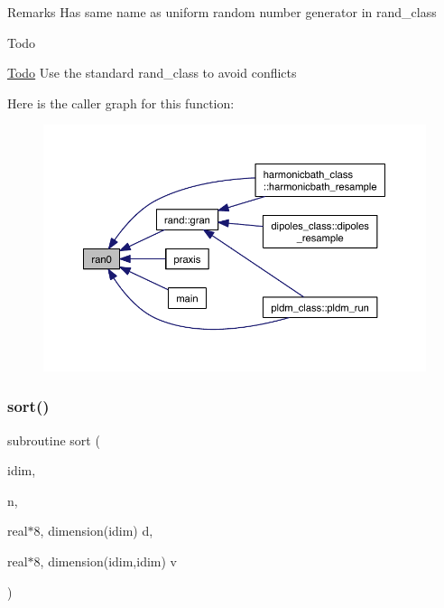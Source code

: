 \begin{DoxyRemark}{Remarks}
Has same name as uniform random number generator in rand\+\_\+class 
\end{DoxyRemark}
\begin{DoxyRefDesc}{Todo}
\item[\hyperlink{todo__todo000004}{Todo}]Use the standard rand\+\_\+class to avoid conflicts \end{DoxyRefDesc}
Here is the caller graph for this function\+:\nopagebreak
\begin{figure}[H]
\begin{center}
\leavevmode
\includegraphics[width=350pt]{praxis_8f_af54b43bfee4d4da9d35c12de385dd6cd_icgraph}
\end{center}
\end{figure}
\mbox{\label{praxis_8f_a462bf29e7634caebf340f472d7b13bd0}} 
\subsubsection{\texorpdfstring{sort()}{sort()}}
{\footnotesize\ttfamily subroutine sort (\begin{DoxyParamCaption}\item[{}]{idim,  }\item[{}]{n,  }\item[{real$\ast$8, dimension(idim)}]{d,  }\item[{real$\ast$8, dimension(idim,idim)}]{v }\end{DoxyParamCaption})}

